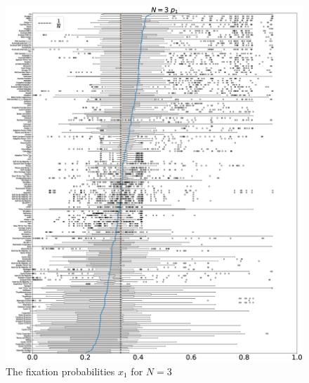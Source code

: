 \documentclass[10pt,letterpaper]{article}
\begin{document}
\begin{figure}[!hbtp]
    \centering
    \includegraphics[draft, width=\textwidth]{./Fig13.eps}
    \caption{The fixation probabilities \(x_1\) for \(N=3\)}
    \label{invasion-3}
\end{figure}
\end{document}
